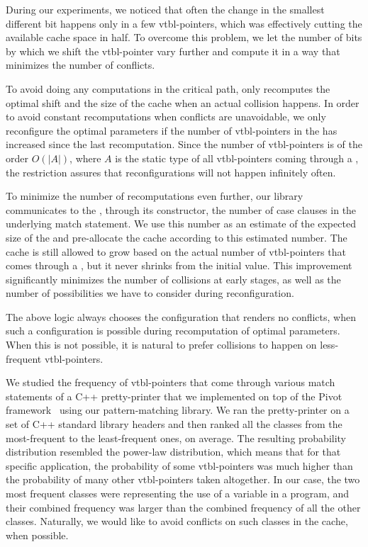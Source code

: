 During our experiments, we noticed that often the change in the smallest 
different bit happens only in a few vtbl-pointers, which was effectively 
cutting the available cache space in half. To overcome this problem, we let the 
number of bits by which we shift the vtbl-pointer vary further and compute it in 
a way that minimizes the number of conflicts.

To avoid doing any computations in the critical path,  only 
recomputes the optimal shift and the size of the cache when an actual collision 
happens. In order to avoid constant recomputations when conflicts are unavoidable, 
we only reconfigure the optimal parameters if 
the number of vtbl-pointers in the  has increased since the last 
recomputation. Since the number of vtbl-pointers is of the order $O(|A|)$, where 
$A$ is the static type of all vtbl-pointers coming through a , the 
restriction assures that reconfigurations will not happen infinitely often.

To minimize the number of recomputations even further, our library communicates 
to the , through its constructor, the number of case clauses in 
the underlying match statement. We use this number as an estimate of the expected 
size of the  and pre-allocate the cache according to this estimated 
number. The cache is still allowed to grow based on the actual number of 
vtbl-pointers that comes through a , but it never shrinks from the
initial value. This improvement significantly minimizes the number of collisions 
at early stages, as well as the number of possibilities we have to consider 
during reconfiguration.

The above logic always chooses the configuration that renders 
no conflicts, when such a configuration is possible during recomputation of 
optimal parameters. When this is not possible, it is natural to prefer collisions 
to happen on less-frequent vtbl-pointers.

We studied the frequency of vtbl-pointers that come through various match statements
of a C++ pretty-printer that we implemented on top of the Pivot 
framework~\cite{Pivot09} using our pattern-matching library. We ran the 
pretty-printer on a set of C++ standard library headers and then ranked all the  
classes from the most-frequent to the least-frequent ones, on average. The 
resulting probability distribution resembled the power-law distribution, which means 
that for that specific application, the probability of some vtbl-pointers was much 
higher than the probability of many other vtbl-pointers taken altogether. In 
our case, the two most frequent classes were representing the use of a variable in 
a program, and their combined frequency was larger than the combined frequency 
of all the other classes. Naturally, we would like to avoid conflicts on such 
classes in the cache, when possible.

